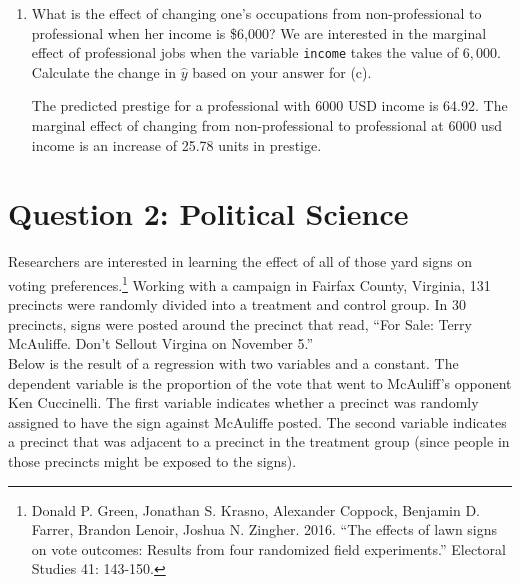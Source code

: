 \documentclass[12pt,letterpaper]{article}
\begin{document}
\begin{enumerate}
	\item [(g)]
	What is the effect of changing one's occupations from non-professional to professional when her income is \$6,000? We are interested in the marginal effect of professional jobs when the variable \texttt{income} takes the value of $6,000$. Calculate the change in $\hat{y}$ based on your answer for (c).
	
	\noindent The predicted prestige for a professional with 6000 USD income is 64.92. The marginal effect of changing from non-professional to professional at 6000 usd income is an increase of 25.78 units in prestige.
	
	
\end{enumerate}

\newpage

\section*{Question 2: Political Science}
\vspace{.25cm}
\noindent 	Researchers are interested in learning the effect of all of those yard signs on voting preferences.\footnote{Donald P. Green, Jonathan	S. Krasno, Alexander Coppock, Benjamin D. Farrer,	Brandon Lenoir, Joshua N. Zingher. 2016. ``The effects of lawn signs on vote outcomes: Results from four randomized field experiments.'' Electoral Studies 41: 143-150. } Working with a campaign in Fairfax County, Virginia, 131 precincts were randomly divided into a treatment and control group. In 30 precincts, signs were posted around the precinct that read, ``For Sale: Terry McAuliffe. Don't Sellout Virgina on November 5.'' \\

Below is the result of a regression with two variables and a constant.  The dependent variable is the proportion of the vote that went to McAuliff's opponent Ken Cuccinelli. The first variable indicates whether a precinct was randomly assigned to have the sign against McAuliffe posted. The second variable indicates
a precinct that was adjacent to a precinct in the treatment group (since people in those precincts might be exposed to the signs).  \\
\end{document}
